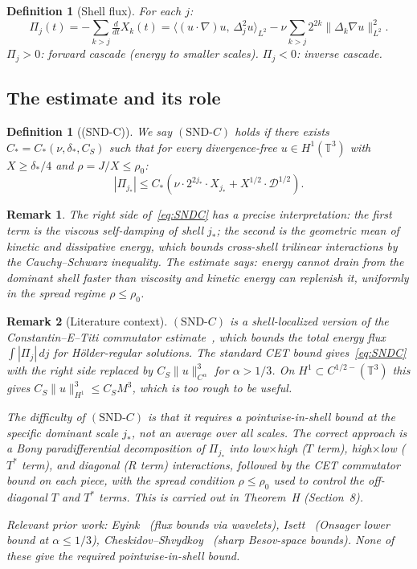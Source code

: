 \documentclass[11pt]{article}
\newtheorem{definition}[theorem]{Definition}
\newtheorem*{remark}{Remark}
\newcommand{\norm}[2]{\|{#1}\|_{#2}}
\newcommand{\T}{\mathbb{T}}
\newcommand{\ddt}{\tfrac{d}{dt}}
\newcommand{\DD}{\mathcal{D}}
\begin{document}
\begin{definition}[Shell flux]\label{def:flux}
For each $j$:
\[
  \Pi_j(t)
  = -\sum_{k>j}\ddt X_k(t)
  = \langle(u\cdot\nabla)u,\, \Delta_j^2 u\rangle_{L^2}
  - \nu\sum_{k>j}2^{2k}\norm{\Delta_k\nabla u}{L^2}^2.
\]
$\Pi_j>0$: forward cascade (energy to smaller scales).
$\Pi_j<0$: inverse cascade.
\end{definition}

\subsection{The estimate and its role}

\begin{definition}[(SND-C)]\label{def:SNDC}
We say $(\mathrm{SND}\text{-}C)$ holds if there exists
$C_*=C_*(\nu,\delta_*,C_S)$ such that for every divergence-free
$u\in H^1(\T^3)$ with $X\ge\delta_*/4$ and $\rho=J/X\le\rho_0$:
\begin{equation}\label{eq:SNDC}
  |\Pi_{j_*}|
  \le C_*\!\left(\nu\cdot 2^{2j_*}\cdot X_{j_*}
    + X^{1/2}\cdot\DD^{1/2}\right).
\end{equation}
\end{definition}

\begin{remark}
The right side of~\eqref{eq:SNDC} has a precise interpretation:
the first term is the viscous self-damping of shell $j_*$;
the second is the geometric mean of kinetic and dissipative
energy, which bounds cross-shell trilinear interactions by
the Cauchy--Schwarz inequality.
The estimate says: \emph{energy cannot drain from the dominant shell
faster than viscosity and kinetic energy can replenish it,
uniformly in the spread regime $\rho\le\rho_0$}.
\end{remark}

\begin{remark}[Literature context]
$(\mathrm{SND}\text{-}C)$ is a shell-localized version of the
Constantin--E--Titi commutator estimate~\cite{CET1994},
which bounds the \emph{total} energy flux $\int|\Pi_j|\,dj$
for H\"older-regular solutions.
The standard CET bound gives~\eqref{eq:SNDC} with
the right side replaced by $C_S\norm{u}{C^\alpha}^3$ for
$\alpha>1/3$. On $H^1\subset C^{1/2-}(\T^3)$ this gives
$C_S\norm{u}{H^1}^3\le C_S M^3$, which is too rough to be useful.

The difficulty of $(\mathrm{SND}\text{-}C)$ is that it requires
a \emph{pointwise-in-shell} bound at the specific dominant scale $j_*$,
not an average over all scales.
The correct approach is a Bony paradifferential decomposition
of $\Pi_{j_*}$ into low$\times$high ($T$ term),
high$\times$low ($T^*$ term), and diagonal ($R$ term) interactions,
followed by the CET commutator bound on each piece,
with the spread condition $\rho\le\rho_0$ used to control the
off-diagonal $T$ and $T^*$ terms.
This is carried out in Theorem~H (Section~8).

Relevant prior work:
Eyink~\cite{Eyink1995} (flux bounds via wavelets),
Isett~\cite{Isett2018} (Onsager lower bound at $\alpha\le1/3$),
Cheskidov--Shvydkoy~\cite{CS2010} (sharp Besov-space bounds).
None of these give the required pointwise-in-shell bound.
\end{remark}
\end{document}

